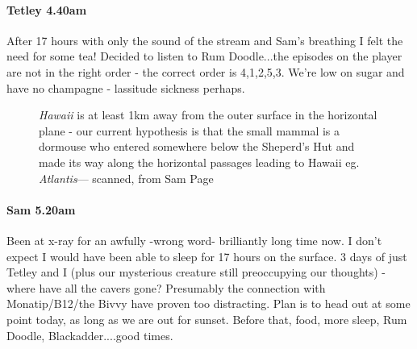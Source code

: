 \paragraph{Tetley 4.40am}
After 17 hours with only the sound of the stream and Sam’s breathing I felt the need for some tea! Decided to listen to Rum Doodle...the episodes on the player are not in the right order - the correct order is 4,1,2,5,3. We’re low on sugar and have no champagne - lassitude sickness perhaps.

\begin{figure}[t!]
\checkoddpage \ifoddpage \forcerectofloat \else \forceversofloat \fi
\centering
{}
\caption{\emph{Hawaii} is at least 1km away from the outer surface in the horizontal plane - our current hypothesis is that the small mammal is a dormouse who entered somewhere below the Sheperd's Hut and made its way along the horizontal passages leading to Hawaii eg. \emph{Atlantis}--- scanned, from Sam Page }
\label{path below Kal}
\end{figure}

\paragraph{Sam 5.20am}
Been at x-ray for an awfully -wrong word- brilliantly long time now. I don't expect I would have been able to sleep for 17 hours on the surface. 3 days of just Tetley and I (plus our mysterious creature still preoccupying our thoughts) - where have all the cavers gone? Presumably the connection with Monatip/B12/the Bivvy have proven too distracting. Plan is to head out at some point today, as long as we are out for sunset. Before that, food, more sleep, Rum Doodle, Blackadder....good times.


